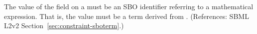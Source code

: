 The value of the  field on a \Constraint must be an SBO
identifier referring to a mathematical expression.  That is, the value must
be a term derived from \sbomathformula.  (References: SBML L2v2
Section~\ref{sec:constraint-sboterm}.)
